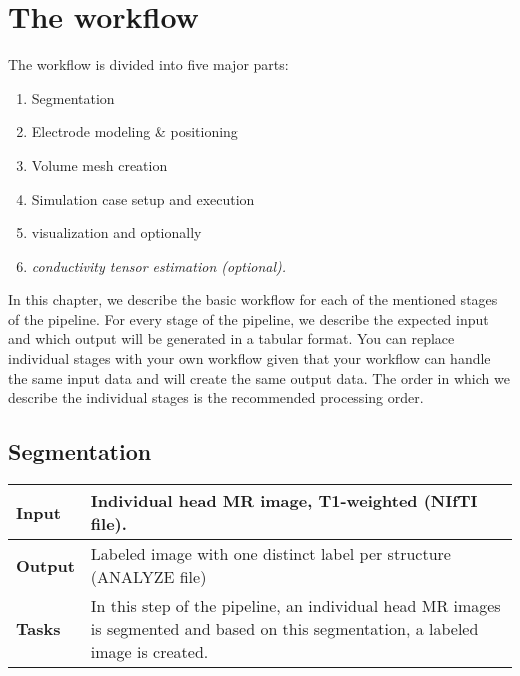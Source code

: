 \newcommand{\bit}[1]{\textit{\textbf{#1}}}

\section{The workflow}
The workflow is divided into five major parts:
\begin{enumerate}
    \item Segmentation
    \item Electrode modeling \& positioning
    \item Volume mesh creation
    \item Simulation case setup and execution
    \item visualization and optionally
    \item \it{conductivity tensor estimation (optional)}.
\end{enumerate}
In this chapter, we describe the basic workflow for each of the mentioned stages of the pipeline. For every stage of
the pipeline, we describe the expected input and which output will be generated in a tabular format. You can replace
individual stages with your own workflow given that your workflow can handle the same input data and will create the
same output data. The order in which we describe the individual stages is the recommended processing order.

\subsection{Segmentation}
\begin{tabular}{ | p{} || p{} | }
    \hline
    \textbf{Input}  & Individual head MR image, T1-weighted (NIfTI file).\\
    \hline
    \textbf{Output} & Labeled image with one distinct label per structure (ANALYZE file) \\ 
    \hline
    \textbf{Tasks} & In this step of the pipeline, an individual head MR images is segmented and based on
                     this segmentation, a labeled image is created. \\
    \hline
\end{tabular}

\hspace{0.5cm}

